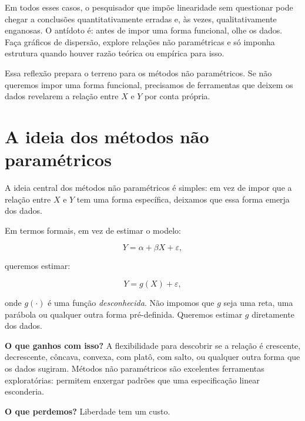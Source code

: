 \begin{destacebox}
Em todos esses casos, o pesquisador que impõe linearidade sem questionar pode chegar a
conclusões quantitativamente erradas e, às vezes, qualitativamente enganosas. O antídoto
é: antes de impor uma forma funcional, olhe os dados. Faça gráficos de dispersão, explore
relações não paramétricas e só imponha estrutura quando houver razão teórica ou empírica
para isso.
\end{destacebox}

Essa reflexão prepara o terreno para os métodos não paramétricos. Se não queremos
impor uma forma funcional, precisamos de ferramentas que deixem os dados revelarem
a relação entre $X$ e $Y$ por conta própria.

\chapter{A ideia dos métodos não paramétricos}

A ideia central dos métodos não paramétricos é simples: em vez de impor que a
relação entre $X$ e $Y$ tem uma forma específica, deixamos que essa forma emerja
dos dados.

Em termos formais, em vez de estimar o modelo:

\begin{equation}
Y = \alpha + \beta X + \varepsilon,
\end{equation}

\noindent
queremos estimar:

\begin{equation}
Y = g(X) + \varepsilon,
\label{eq:nonparam}
\end{equation}

\noindent
onde $g(\cdot)$ é uma função \emph{desconhecida}. Não impomos que $g$ seja uma reta,
uma parábola ou qualquer outra forma pré-definida. Queremos estimar $g$ diretamente
dos dados.

\textbf{O que ganhos com isso?} A flexibilidade para descobrir se a relação é
crescente, decrescente, côncava, convexa, com platô, com salto, ou qualquer outra
forma que os dados sugiram. Métodos não paramétricos são excelentes ferramentas
exploratórias: permitem enxergar padrões que uma especificação linear esconderia.

\textbf{O que perdemos?} Liberdade tem um custo.

